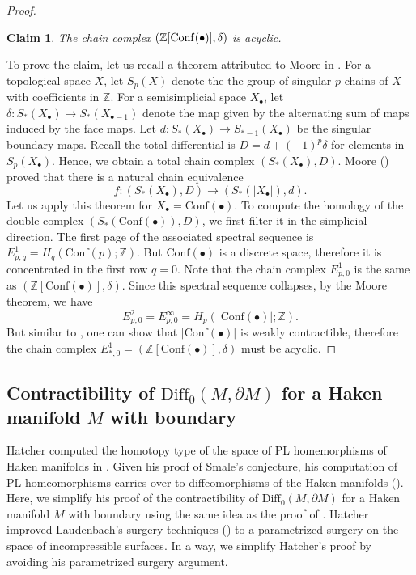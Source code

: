 \documentclass[a4paper]{amsart}
\newtheorem{claim}[thm]{Claim}
\theoremstyle{definition}
\theoremstyle{remark}
\newcommand{\bZ}{\mathbb{Z}}
\newcommand\Diff{\mathrm{Diff}}
\numberwithin{equation}{section}
\begin{document}
\begin{proof}
\begin{claim}The chain complex $(\bZ[\text{\textnormal{Conf}}(\bullet)],\delta)$ is acyclic.
\end{claim}
To prove the claim, let us recall a theorem attributed to Moore in \cite[Theorem 4.1]{mostow1973notes}. For a topological space $X$, let $S_p(X)$ denote the the group of singular $p$-chains of $X$ with coefficients in $\bZ$.  For a semisimplicial space $X_{\bullet}$, let $\delta: S_*(X_{\bullet})\to S_*(X_{\bullet-1})$ denote the map given by the alternating sum of  maps induced by the face maps. Let $d: S_*(X_{\bullet})\to S_{*-1}(X_{\bullet})$ be the singular boundary maps. Recall the total differential is $D=d+(-1)^p\delta$ for elements in $S_p(X_{\bullet})$. Hence, we obtain a total chain complex $(S_*(X_{\bullet}),D)$. Moore (\cite[Theorem 4.1]{mostow1973notes}) proved that there is a natural chain equivalence
\[
f: (S_*(X_{\bullet}),D)\to (S_*(|X_{\bullet}|),d).
\]
Let us apply this theorem for $X_{\bullet}=\text{Conf}(\bullet)$. To compute the homology of the double complex $(S_*(\text{Conf}(\bullet)),D)$, we first filter it in the simplicial direction. The first page of the associated spectral sequence is $E^1_{p,q}=H_q(\text{Conf}(p);\bZ)$. But $\text{Conf}(\bullet)$ is a discrete space, therefore it is concentrated in the first row $q=0$. Note that the chain complex $E^1_{p,0}$ is the same as $(\bZ[\text{Conf}(\bullet)],\delta)$. Since this spectral sequence collapses, by the Moore theorem, we have
\[
E^2_{p,0}=E^{\infty}_{p,0}=H_p(|\text{Conf}(\bullet)|;\bZ).
\]
But similar to , one can show that $|\text{Conf}(\bullet)|$ is weakly contractible, therefore the chain complex $E^1_{*,0}=(\bZ[\text{Conf}(\bullet)],\delta)$ must be acyclic. 
\end{proof}
\subsection{Contractibility of $\Diff_0(M,\partial M)$ for a Haken manifold $M$ with  boundary} Hatcher computed the homotopy type of the space of PL homemorphisms of Haken manifolds in \cite{MR0420620}. Given his proof of Smale's conjecture, his computation of PL homeomorphisms carries over  to diffeomorphisms of the Haken manifolds (\cite{hatcher1999spaces}).  Here, we simplify his  proof of the contractibility of $\Diff_0(M,\partial M)$ for a Haken manifold $M$ with  boundary using the same idea as the proof of . Hatcher improved Laudenbach's surgery techniques (\cite[Chapter 2.5]{MR0356056}) to a parametrized surgery on the space of incompressible surfaces. In a way, we simplify Hatcher's proof by avoiding his parametrized surgery argument. 
\end{document}
